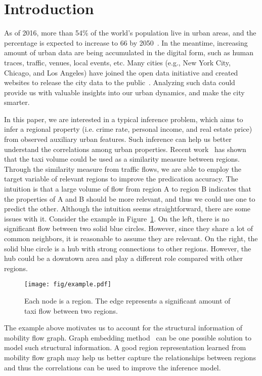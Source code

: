 \section{Introduction}

As of 2016, more than 54\% of the world's population live in urban areas, and the percentage is expected to increase to 66 by 2050~\cite{nations2014world}. In the meantime, increasing amount of urban data are being accumulated in the digital form, such as human traces, traffic, venues, local events, etc. Many cities (e.g., New York City, Chicago, and Los Angeles) have joined the open data initiative and created websites to release the city data to the public~\cite{data-taxi, nyctaxi}. Analyzing such data could provide us with valuable insights into our urban dynamics, and make the city smarter.

In this paper, we are interested in a typical inference problem, which aims to infer a regional property (i.e. crime rate, personal income, and real estate price) from observed auxiliary urban features. Such inference can help us better understand the correlations among urban properties. Recent work~\cite{wang2016crime} has shown that the taxi volume could be used as a similarity measure between regions. Through the similarity measure from traffic flows, we are able to employ the target variable of relevant regions to improve the predication accuracy. The intuition is that a large volume of flow from region A to region B indicates that the properties of A and B should be more relevant, and thus we could use one to predict the other. Although the intuition seems straightforward, there are some issues with it. Consider the example in Figure~\ref{fig:example}. On the left, there is no significant flow between two solid blue circles. However, since they share a lot of common neighbors, it is reasonable to assume they are relevant. On the right, the solid blue circle is a hub with strong connections to other regions. However, the hub could be a downtown area and play a different role compared with other regions.

\begin{figure}[h]
\centering
\texttt{[image: fig/example.pdf]}
\caption{Each node is a region. The edge represents a significant amount of taxi flow between two regions.}
\label{fig:example}
\end{figure}
\vspace{-4mm}

The example above motivates us to account for the structural information of mobility flow graph. Graph embedding method~\cite{perozzi2014deepwalk,tang2015line} can be one possible solution to model such structural information. A good region representation learned from mobility flow graph may help us better capture the relationships between regions and thus the correlations can be used to improve the inference model.

